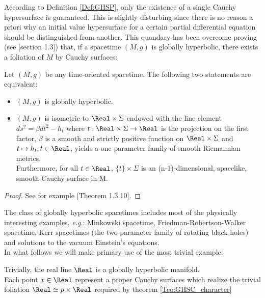 \documentclass[Main]{subfiles}
\begin{document}
			According to Definition \ref{Def:GHSP}, only the existence of a single Cauchy hypersurface is guaranteed.
			This is slightly disturbing since there is no reason a priori why an initial value hypersurface for a certain partial differential equation should be distinguished from another.
			This quandary has been overcome proving (see \cite{Baer2008}[section 1.3]) that, if a spacetime $(M,g)$ is globally hyperbolic, there exists a foliation of $M$ by Cauchy surfaces:
			\begin{theorem}\label{Teo:GHSC_character}
				Let $(M,g)$ be any time-oriented spacetime. The following two statements are equivalent:
				\begin{itemize}
					\item $(M,g)$ is globally hyperbolic.
					\item $(M,g)$ is isometric to $ \Real \times \Sigma $
						endowed with the line element $ds^2 = \beta dt^2 - h_t$
						where $t : \Real \times \Sigma \rightarrow \Real$ is the projection on the first factor,
						$\beta$ is a smooth and strictly positive function on $\Real \times \Sigma$
						and $t \mapsto h_t , t \in \Real$, yields a one-parameter family of smooth Riemannian metrics.\\
						Furthermore, for all $t\in \Real$, $\{t\}\times \Sigma$ is an (n-1)-dimensional, spacelike, smooth Cauchy surface in M.
				\end{itemize}
			\end{theorem}
			\begin{proof}
			See for example \cite{Baer2008}[Theorem 1.3.10].
			\end{proof}

			The class of globally hyperbolic spacetimes includes most of the physically interesting examples, \textit{e.g.}: Minkowski spacetime, Friedman-Robertson-Walker spacetime, Kerr spacetimes (the two-parameter family of rotating black holes) and solutions to the vacuum Einstein's equations.
			\\
			In what follows we will make primary use of the most trivial example:
			\begin{example}
				Trivially, the real line $\Real$ is a globally hyperbolic manifold.
				\\
				Each point $x\in \Real$ represent a proper Cauchy surfaces which realize the trivial foliation $\Real \simeq {p}\times \Real $ required by theorem \ref{Teo:GHSC_character}
			\end{example}
\end{document}
